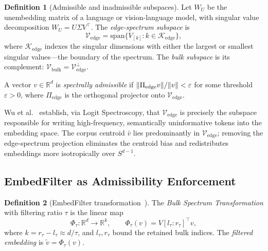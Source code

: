 \documentclass[12pt, a4paper]{article}
\DeclarePairedDelimiter{\norm}{\lVert}{\rVert}
\theoremstyle{plain}
\theoremstyle{definition}
\newtheorem{definition}{Definition}[section]
\begin{document}
\begin{definition}[Admissible and inadmissible subspaces]
Let $W_U$ be the unembedding matrix of a language or vision-language model,
with singular value decomposition $W_U = U \Sigma V^\top$. The
\emph{edge-spectrum subspace} is
\begin{equation}
  \mathcal{V}_{\mathrm{edge}} = \mathrm{span}\{V_{[k]} : k \in
  \mathcal{K}_{\mathrm{edge}}\},
\end{equation}
where $\mathcal{K}_{\mathrm{edge}}$ indexes the singular dimensions with
either the largest or smallest singular values---the boundary of the
spectrum. The \emph{bulk subspace} is its complement:
$\mathcal{V}_{\mathrm{bulk}} = \mathcal{V}_{\mathrm{edge}}^\perp$.

A vector $v \in \mathbb{R}^d$ is \emph{spectrally admissible} if
$\norm{\Pi_{\mathrm{edge}} v} / \norm{v} < \varepsilon$ for some threshold
$\varepsilon > 0$, where $\Pi_{\mathrm{edge}}$ is the orthogonal projector
onto $\mathcal{V}_{\mathrm{edge}}$.
\end{definition}

Wu et al.~\cite{wu2026embedfilter} establish, via Logit Spectroscopy, that
$\mathcal{V}_{\mathrm{edge}}$ is precisely the subspace responsible for
writing high-frequency, semantically uninformative tokens into the embedding
space. The corpus centroid $\bar{v}$ lies predominantly in
$\mathcal{V}_{\mathrm{edge}}$; removing the edge-spectrum projection
eliminates the centroid bias and redistributes embeddings more isotropically
over $S^{d-1}$.

\subsection{EmbedFilter as Admissibility Enforcement}

\begin{definition}[EmbedFilter transformation~\cite{wu2026embedfilter}]
The \emph{Bulk Spectrum Transformation} with filtering ratio $\tau$ is the
linear map
\begin{equation}
  \Phi_\tau : \mathbb{R}^d \to \mathbb{R}^k, \qquad
  \Phi_\tau(v) = V[l_\tau : r_\tau]^\top v,
\end{equation}
where $k = r_\tau - l_\tau \approx d/\tau$, and $l_\tau, r_\tau$ bound the
retained bulk indices. The \emph{filtered embedding} is
$\tilde{v} = \Phi_\tau(v)$.
\end{definition}
\end{document}

